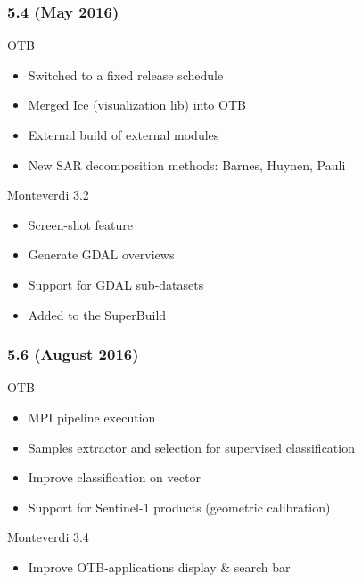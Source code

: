 \documentclass[8pt]{beamer}
\begin{document}
\begin{frame}
\frametitle{5.4 (May 2016)}
\begin{block}{OTB}
\begin{itemize}
\item Switched to a fixed release schedule
\item Merged Ice (visualization lib) into OTB
\item External build of external modules
\item New SAR decomposition methods: Barnes, Huynen, Pauli
\end{itemize}
\end{block}

\begin{block}{Monteverdi 3.2}
\begin{itemize}
\item Screen-shot feature
\item Generate GDAL overviews
\item Support for GDAL sub-datasets
\item Added to the SuperBuild
\end{itemize}
\end{block}
\end{frame}

\begin{frame}
\frametitle{5.6 (August 2016)}
\begin{block}{OTB}
\begin{itemize}
\item MPI pipeline execution
\item Samples extractor and selection for supervised classification
\item Improve classification on vector
\item Support for Sentinel-1 products (geometric calibration)
\end{itemize}
\end{block}

\begin{block}{Monteverdi 3.4}
\begin{itemize}
\item Improve OTB-applications display \& search bar
\end{itemize}
\end{block}
\end{frame}
\end{document}
